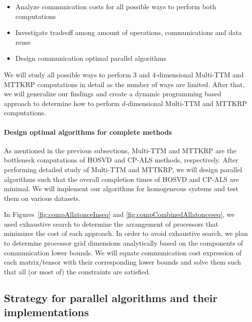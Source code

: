 \documentclass[a4paper,11pt]{article}
\begin{document}
	
	\begin{itemize}
		\item Analyze communication costs for all possible ways to perform both computations 
		\item Investigate tradeoff among amount of operations, communications and data reuse
		\item Design communication optimal parallel algorithms
	\end{itemize}
	
	
	We will study all possible ways to perform $3$ and $4$-dimensional Multi-TTM and MTTKRP computations in detail as the number of ways are limited. After that, we will generalize our findings and create a dynamic programming based approach to determine how to perform $d$-dimensional Multi-TTM and MTTKRP computations.
	
	\paragraph{Design optimal algorithms for complete methods}
	As mentioned in the previous subsections, Multi-TTM and MTTKRP are  the bottleneck computations of HOSVD and CP-ALS methods, respectively. After performing detailed study of Multi-TTM and MTTKRP, we will design parallel algorithms such that the overall completion times of HOSVD and CP-ALS are minimal. We will implement our algorithms for homogeneous systems and test them on various datasets. 
	
	In Figures~\ref{fig:compAllatonceInseq} and \ref{fig:compCombinedAllatonceseq}, we used exhaustive search to determine the arrangement of processors that minimizes the cost of each approach. In order to avoid exhaustive search, we plan to determine processor grid dimensions analytically based on the components of communication lower bounds. We will equate communication cost expression of each matrix/tensor with their corresponding lower bounds and solve them such that all (or most of) the constraints are satisfied.
	

	
	
	\subsection{Strategy for parallel algorithms and their implementations}
	
\end{document}
